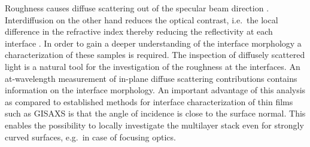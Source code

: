 \documentclass{iucr}              %
\begin{document}
Roughness causes diffuse scattering out of the specular beam direction \cite{sinha_scattering_natural_tool}. Interdiffusion on the other hand reduces the optical contrast, i.e.~the local difference in the refractive index thereby reducing the reflectivity at each interface \cite{nakajima_interdiffusion}. In order to gain a deeper understanding of the interface morphology a characterization of these samples is required. The inspection of diffusely scattered light is a natural tool for the investigation of the roughness at the interfaces. An at-wavelength measurement of in-plane diffuse scattering contributions contains information on the interface morphology. An important advantage of this analysis as compared to established methods for interface characterization of thin films such as GISAXS \cite{Levine:pn0068} is that the angle of incidence is close to the surface normal. This enables the possibility to locally investigate the multilayer stack even for strongly curved surfaces, e.g.~in case of focusing optics.
\end{document}
